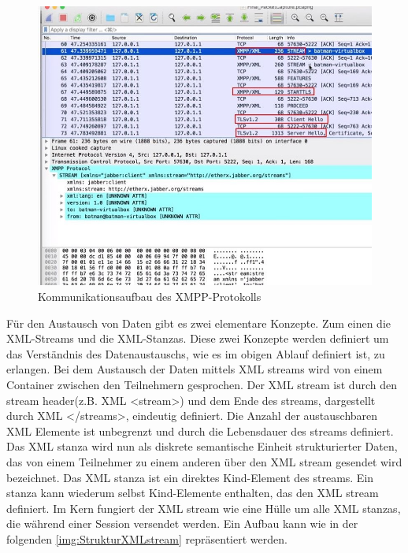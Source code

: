 \documentclass[a4paper,titlepage,halfparskip,12pt]{scrreprt}
\begin{document}
\begin{onehalfspacing}
\begin{figure}[h]
	\centering
	\includegraphics[width=\textwidth]{images/XML_Wireshark}
	\caption{Kommunikationsaufbau des \ac{XMPP}-Protokolls}
	\label{img:XMPPcommunication}
\end{figure} 
\newpage
Für den Austausch von Daten gibt es zwei elementare Konzepte. Zum einen die \ac{XML}-Streams und die \ac{XML}-Stanzas. Diese zwei Konzepte werden definiert um das Verständnis des Datenaustauschs, wie es im obigen Ablauf definiert ist, zu erlangen. Bei dem Austausch der Daten mittels \ac{XML} streams wird von einem Container zwischen den Teilnehmern gesprochen. Der \ac{XML} stream ist durch den \glqq stream header\grqq (z.B. \ac{XML} <stream>) und dem Ende des streams, dargestellt durch \ac{XML} </streams>, eindeutig definiert. Die Anzahl der austauschbaren \ac{XML} Elemente ist unbegrenzt und durch die Lebensdauer des streams definiert. Das \ac{XML} stanza wird nun als diskrete semantische Einheit strukturierter Daten, das von einem Teilnehmer zu einem anderen über den \ac{XML} stream gesendet wird bezeichnet. Das \ac{XML} stanza ist ein direktes Kind-Element des streams. Ein stanza kann wiederum selbst Kind-Elemente enthalten, das den \ac{XML} stream definiert. Im Kern fungiert der \ac{XML} stream wie eine Hülle um alle \ac{XML} stanzas, die während einer Session versendet werden. Ein Aufbau kann wie in der folgenden \autoref{img:StrukturXMLstream} repräsentiert werden. \cite{RFC6120Sec4}
\begin{figure}[h]
	\centering

\end{figure}
\end{onehalfspacing}
\end{document}
